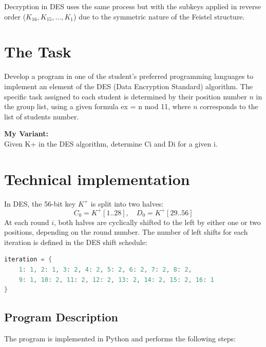 \documentclass[12pt]{article}
\begin{document}
Decryption in DES uses the same process but with the subkeys applied in reverse order (\( K_{16}, K_{15}, \ldots, K_1 \)) due to the symmetric nature of the Feistel structure.

\section*{The Task}

Develop a program in one of the student's preferred programming languages to implement an element of the DES (Data Encryption Standard) algorithm.  
The specific task assigned to each student is determined by their position number \(n\) in the group list, using a given formula ex = n mod 11, where \(n\) corresponds to the list of students number.


\textbf{My Variant:} \\
Given K+ in the DES algorithm, determine Ci and Di for a given i.

\section*{Technical implementation}
\hspace{0.8cm}
In DES, the 56-bit key \( K^{+} \) is split into two halves:
\[
C_0 = K^{+}[1..28], \quad D_0 = K^{+}[29..56]
\]
At each round \( i \), both halves are cyclically shifted to the left by either one or two positions, depending on the round number.  
The number of left shifts for each iteration is defined in the DES shift schedule:

    \begin{lstlisting}[language=Java]
        iteration = {
    1: 1, 2: 1, 3: 2, 4: 2, 5: 2, 6: 2, 7: 2, 8: 2,
    9: 1, 10: 2, 11: 2, 12: 2, 13: 2, 14: 2, 15: 2, 16: 1
}
    \end{lstlisting}

\subsection*{Program Description}

The program is implemented in Python and performs the following steps:
\end{document}

